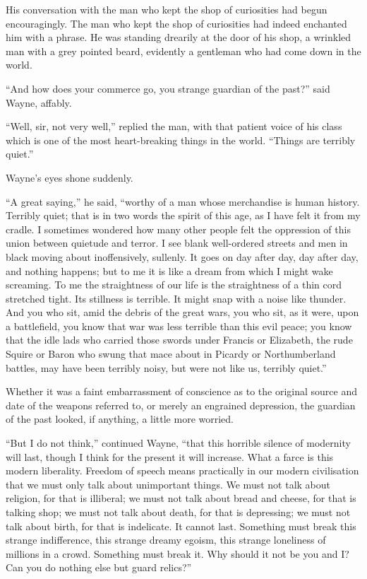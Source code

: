 \documentclass{book}
\begin{document}
His conversation with the man who kept the shop of curiosities had begun encouragingly. The man who kept the shop of curiosities had indeed enchanted him with a phrase. He was standing drearily at the door of his shop, a wrinkled man with a grey pointed beard, evidently a gentleman who had come down in the world.

“And how does your commerce go, you strange guardian of the past?” said Wayne, affably.

“Well, sir, not very well,” replied the man, with that patient voice of his class which is one of the most heart-breaking things in the world. “Things are terribly quiet.”

Wayne’s eyes shone suddenly.

“A great saying,” he said, “worthy of a man whose merchandise is human history. Terribly quiet; that is in two words the spirit of this age, as I have felt it from my cradle. I sometimes wondered how many other people felt the oppression of this union between quietude and terror. I see blank well-ordered streets and men in black moving about inoffensively, sullenly. It goes on day after day, day after day, and nothing happens; but to me it is like a dream from which I might wake screaming. To me the straightness of our life is the straightness of a thin cord stretched tight. Its stillness is terrible. It might snap with a noise like thunder. And you who sit, amid the debris of the great wars, you who sit, as it were, upon a battlefield, you know that war was less terrible than this evil peace; you know that the idle lads who carried those swords under Francis or Elizabeth, the rude Squire or Baron who swung that mace about in Picardy or Northumberland battles, may have been terribly noisy, but were not like us, terribly quiet.”

Whether it was a faint embarrassment of conscience as to the original source and date of the weapons referred to, or merely an engrained depression, the guardian of the past looked, if anything, a little more worried.

“But I do not think,” continued Wayne, “that this horrible silence of modernity will last, though I think for the present it will increase. What a farce is this modern liberality. Freedom of speech means practically in our modern civilisation that we must only talk about unimportant things. We must not talk about religion, for that is illiberal; we must not talk about bread and cheese, for that is talking shop; we must not talk about death, for that is depressing; we must not talk about birth, for that is indelicate. It cannot last. Something must break this strange indifference, this strange dreamy egoism, this strange loneliness of millions in a crowd. Something must break it. Why should it not be you and I? Can you do nothing else but guard relics?”
\end{document}

